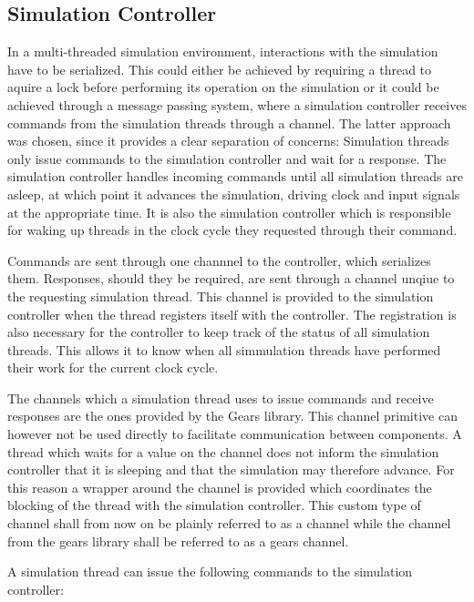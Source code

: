 \subsection{Simulation Controller} %

In a multi-threaded simulation environment, interactions with the simulation have to be serialized. This could either
be achieved by requiring a thread to aquire a lock before performing its operation on the simulation or it could be
achieved through a message passing system, where a simulation controller receives commands from the simulation
threads through a channel. The latter approach was chosen, since it provides a clear separation of concerns:
Simulation threads only issue commands to the simulation controller and wait for a response. The simulation
controller handles incoming commands until all simulation threads are asleep, at which point it advances the
simulation, driving clock and input signals at the appropriate time. It is also the simulation controller which is
responsible for waking up threads in the clock cycle they requested through their  command.

Commands are sent through one channnel to the controller, which serializes them. Responses, should they be required,
are sent through a channel unqiue to the requesting simulation thread. This channel is provided to the simulation
controller when the thread registers itself with the controller. The registration is also necessary for the
controller to keep track of the status of all simulation threads. This allows it to know when all simmulation threads
have performed their work for the current clock cycle.

The channels which a simulation thread uses to issue commands and receive responses are the ones provided by the
Gears library. This channel primitive can however not be used directly to facilitate communication between
components. A thread which waits for a value on the channel does not inform the simulation controller that it is
sleeping and that the simulation may therefore advance. For this reason a wrapper around the channel is provided
which coordinates the blocking of the thread with the simulation controller. This custom type of channel shall from
now on be plainly referred to as a channel while the channel from the gears library shall be referred to as a gears channel.

A simulation thread can issue the following commands to the simulation controller:

